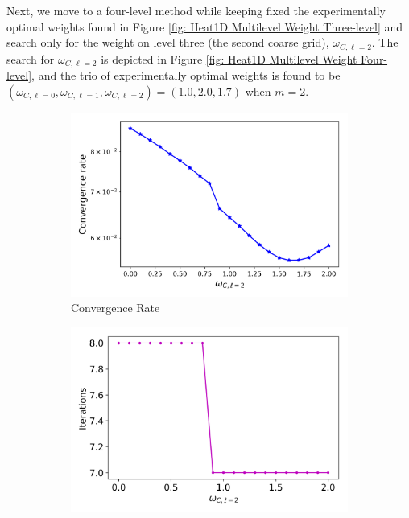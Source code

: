 \documentclass[VANCOUVER,STIX1COL]{WileyNJD-v2}
\begin{document}
Next, we move to a four-level method while keeping fixed the experimentally optimal weights found in Figure 
\ref{fig: Heat1D Multilevel Weight Three-level} and search only for the weight on level three (the second
coarse grid), $\omega_{C,\ell=2}$.  The search for $\omega_{C,\ell=2}$ is depicted in Figure 
\ref{fig: Heat1D Multilevel Weight Four-level}, and the trio of experimentally optimal weights is 
found to be $(\omega_{C,\ell=0}, \omega_{C,\ell=1}, \omega_{C,\ell=2})=(1.0, 2.0, 1.7)$ when $m=2$.

\begin{figure}[h!]
    \centering
    \begin{subfigure}[b]{0.4\textwidth}
    \includegraphics[width=\textwidth]{images/Heat1D_4097_Multi_Weights_Four_Level_Conv.png}
    \caption{\normalsize Convergence Rate}
    \end{subfigure}
     \begin{subfigure}[b]{0.4\textwidth}
    \includegraphics[width=\textwidth]{images/Heat1D_4097_Multi_Weights_Four_Level_Iter.png}

\end{subfigure}
\end{figure}
\end{document}
